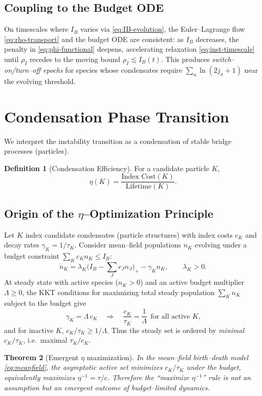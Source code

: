 \documentclass[11pt]{article}
\theoremstyle{plain}
\newtheorem{theorem}{Theorem}[section]
\theoremstyle{definition}
\newtheorem{definition}[theorem]{Definition}
\begin{document}
\subsection{Coupling to the Budget ODE}\label{subsec:coupling-ode}
On timescales where $I_B$ varies via \eqref{eq:IB-evolution}, the Euler–Lagrange flow \eqref{eq:rho-transport} and the budget ODE are consistent: as $I_B$ decreases, the penalty in \eqref{eq:phi-functional} deepens, accelerating relaxation \eqref{eq:inst-timescale} until $\rho_I$ recedes to the moving bound $\rho_I\lesssim I_B(t)$. This produces \emph{switch–on/turn–off epochs} for species whose condensates require $\sum_a\ln(2j_a+1)$ near the evolving threshold.

\section{Condensation Phase Transition}
We interpret the instability transition as a condensation of stable bridge processes (particles).
\begin{definition}[Condensation Efficiency]
  For a candidate particle $K$,
  \begin{equation}
    \eta(K) = \frac{\text{Index Cost}(K)}{\text{Lifetime}(K)}.
  \end{equation}
\end{definition}

\subsection{Origin of the $\eta$–Optimization Principle}\label{subsec:eta-origin}

Let $K$ index candidate condensates (particle structures) with index costs $c_K$ and decay rates $\gamma_K=1/\tau_K$. Consider mean–field populations $n_K$ evolving under a budget constraint $\sum_K c_K n_K \le I_B$:
\begin{equation}
  \dot n_K
  = \lambda_K\big(I_B - \sum_J c_J n_J\big)_+ - \gamma_K n_K,
  \qquad \lambda_K>0.
  \label{eq:meanfield}
\end{equation}
At steady state with active species ($n_K>0$) and an active budget multiplier $\Lambda\ge0$, the KKT conditions for maximizing total steady population $\sum_K n_K$ subject to the budget give
\begin{equation}
  \gamma_K = \Lambda\, c_K
  \quad\Rightarrow\quad
  \frac{c_K}{\tau_K} = \frac{1}{\Lambda} \ \ \text{for all active $K$,}
\end{equation}
and for inactive $K$, $c_K/\tau_K \ge 1/\Lambda$. Thus the steady set is ordered by \emph{minimal} $c_K/\tau_K$, i.e.\ maximal $\tau_K/c_K$.
\begin{theorem}[Emergent $\eta$ maximization]\label{thm:eta-emergent}
  In the mean–field birth–death model \eqref{eq:meanfield}, the asymptotic active set minimizes $c_K/\tau_K$ under the budget, equivalently \emph{maximizes} $\eta^{-1}=\tau/c$. Therefore the “maximize $\eta^{-1}$” rule is not an assumption but an emergent outcome of budget–limited dynamics.
\end{theorem}
\end{document}
